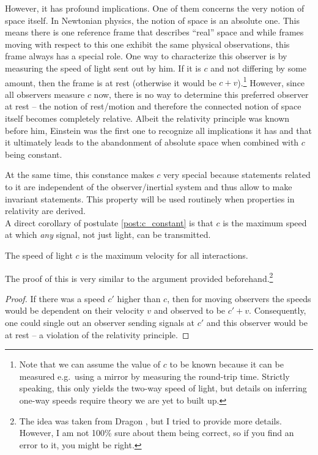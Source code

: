 However, it has profound implications. One of them concerns the very notion of space itself. In Newtonian physics, the notion of space is an absolute one. This means there is one reference frame that describes \enquote{real} space and while frames moving with respect to this one exhibit the same physical observations, this frame always has a special role. One way to characterize this observer is by measuring the speed of light sent out by him. If it is $c$ and not differing by some amount, then the frame is at rest (otherwise it would be $c + v$).\footnote{Note that we can assume the value of $c$ to be known because it can be measured e.g.~using a mirror by measuring the round-trip time. Strictly speaking, this only yields the two-way speed of light, but details on inferring one-way speeds require theory we are yet to built up.} However, since all observers measure $c$ now, there is no way to determine this preferred observer at rest -- the notion of rest/motion and therefore the connected notion of space itself becomes completely relative. Albeit the relativity principle was known before him, Einstein was the first one to recognize all implications it has and that it ultimately leads to the abandonment of absolute space when combined with $c$ being constant.


At the same time, this constance makes $c$ very special because statements related to it are independent of the observer/inertial system and thus allow to make invariant statements. This property will be used routinely when properties in relativity are derived.\\



A direct corollary of postulate \ref{post:c_constant} is that $c$ is the maximum speed at which \emph{any} signal, not just light, can be transmitted.
\begin{prop}%
	The speed of light $c$ is the maximum velocity for all interactions.
\end{prop}
The proof of this is very similar to the argument provided beforehand.\footnote{The idea was taken from Dragon \cite{dragon_geometry_srt}, but I tried to provide more details. However, I am not 100\% sure about them being correct, so if you find an error to it, you might be right.}
\begin{proof}
	If there was a speed $c'$ higher than $c$, then for moving observers the speeds would be dependent on their velocity $v$ and observed to be $c' + v$. Consequently, one could single out an observer sending signals at $c'$ and this observer would be at rest -- a violation of the relativity principle.
\end{proof}

